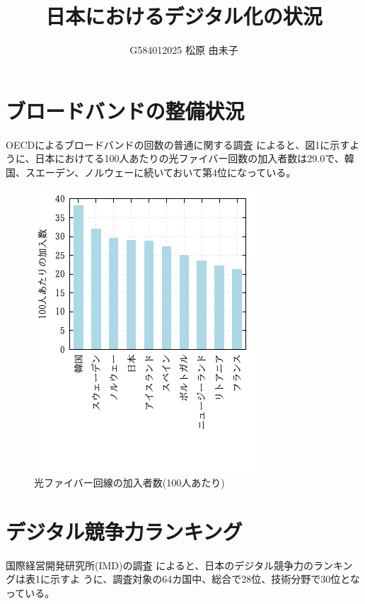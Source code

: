 \documentclass[a4paper,11pt,dvipdfmx]{ujarticle}
\title{日本におけるデジタル化の状況}
\author{G584012025 松原 由未子}
\begin{document}
\maketitle %

\section{ブロードバンドの整備状況}
OECDによるブロードバンドの回数の普通に関する調査\cite{oecd}
によると、図1に示すように、日本におけてる100人あたりの光ファイバー回数の加入者数は29.0で、韓国、スエーデン、ノルウェーに続いておいて第4位になっている。

\begin{figure}[htbp]
    \centering
    \includegraphics{fig11.png}
    \caption{光ファイバー回線の加入者数(100人あたり)}
\end{figure}

\section{デジタル競争力ランキング}
国際経営開発研究所(IMD)の調査\cite{imd}
によると、日本のデジタル競争力のランキングは表1に示すよ
うに、調査対象の64カ国中、総合で28位、技術分野で30位となっている。
\end{document}
